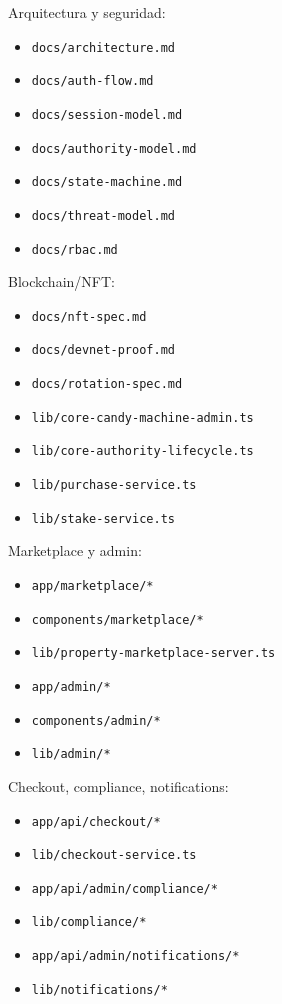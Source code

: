 \documentclass[
  10pt,
  letterpaper,
]{article}
\providecommand{\tightlist}{%
  \setlength{\itemsep}{0pt}\setlength{\parskip}{0pt}}
\let\oldtexttt\texttt
\renewcommand{\texttt}[1]{\oldtexttt{\small #1}}
\begin{document}
Arquitectura y seguridad:

\begin{itemize}
\tightlist
\item
  \texttt{docs/architecture.md}
\item
  \texttt{docs/auth-flow.md}
\item
  \texttt{docs/session-model.md}
\item
  \texttt{docs/authority-model.md}
\item
  \texttt{docs/state-machine.md}
\item
  \texttt{docs/threat-model.md}
\item
  \texttt{docs/rbac.md}
\end{itemize}

Blockchain/NFT:

\begin{itemize}
\tightlist
\item
  \texttt{docs/nft-spec.md}
\item
  \texttt{docs/devnet-proof.md}
\item
  \texttt{docs/rotation-spec.md}
\item
  \texttt{lib/core-candy-machine-admin.ts}
\item
  \texttt{lib/core-authority-lifecycle.ts}
\item
  \texttt{lib/purchase-service.ts}
\item
  \texttt{lib/stake-service.ts}
\end{itemize}

Marketplace y admin:

\begin{itemize}
\tightlist
\item
  \texttt{app/marketplace/*}
\item
  \texttt{components/marketplace/*}
\item
  \texttt{lib/property-marketplace-server.ts}
\item
  \texttt{app/admin/*}
\item
  \texttt{components/admin/*}
\item
  \texttt{lib/admin/*}
\end{itemize}

Checkout, compliance, notifications:

\begin{itemize}
\tightlist
\item
  \texttt{app/api/checkout/*}
\item
  \texttt{lib/checkout-service.ts}
\item
  \texttt{app/api/admin/compliance/*}
\item
  \texttt{lib/compliance/*}
\item
  \texttt{app/api/admin/notifications/*}
\item
  \texttt{lib/notifications/*}
\end{itemize}
\end{document}
